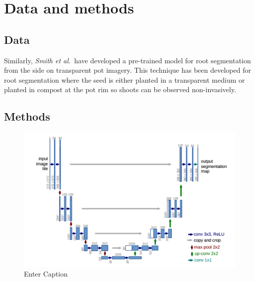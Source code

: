 \section{Data and methods}\label{sec:data-n-methods}

\subsection{Data}\label{subsec:data}




Similarly,  \textit{Smith et al.}~\cite{smithSegmentationRootsSoil2020}have developed a pre-trained model for root segmentation from the side on transparent pot imagery. This technique has been developed for root segmentation where the seed is either planted in a transparent medium or planted in compost at the pot rim so shoots can be observed non-invasively.


\subsection{Methods}\label{subsec:methods}

\begin{figure}
    \centering
    \includegraphics[width=0.5\linewidth]{assets//01_introduction/Screenshot 2024-05-22 at 16.06.04.png}
    \caption{Enter Caption}
    \label{fig:enter-label}
\end{figure}

